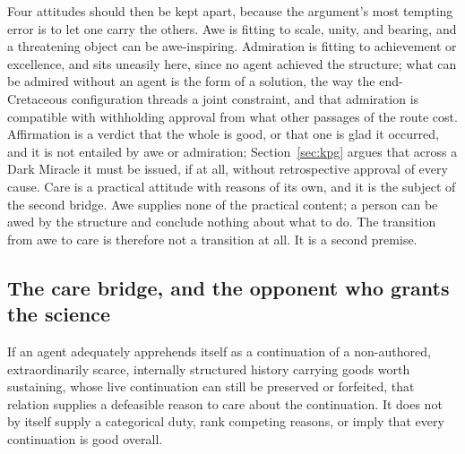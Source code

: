 Four attitudes should then be kept apart, because the argument's most tempting
error is to let one carry the others. Awe is fitting to scale, unity, and
bearing, and a threatening object can be awe-inspiring. Admiration is fitting
to achievement or excellence, and sits uneasily here, since no agent achieved
the structure; what can be admired without an agent is the form of a solution,
the way the end-Cretaceous configuration threads a joint constraint, and that
admiration is compatible with withholding approval from what other passages of
the route cost. Affirmation is
a verdict that the whole is good, or that one is glad it occurred, and it is
not entailed by awe or admiration; Section~\ref{sec:kpg} argues that across a
Dark Miracle it must be issued, if at all, without retrospective approval of
every cause.
 Care is a
practical attitude with reasons of its own, and it is the subject of the
second bridge. Awe supplies none of the practical content; a person can be
awed by the structure and conclude nothing about what to do. The transition
from awe to care is therefore not a transition at all. It is a second
premise.

\subsection*{The care bridge, and the opponent who grants the science}

\begin{premise}\label{prem:care}
If an agent adequately apprehends itself as a continuation of a
non-authored, extraordinarily scarce, internally structured history
carrying goods worth sustaining, whose live continuation can still be
preserved or forfeited, that relation supplies a defeasible reason to care
about the continuation. It does not by itself supply a categorical duty,
rank competing reasons, or imply that every continuation is good overall.
\end{premise}

